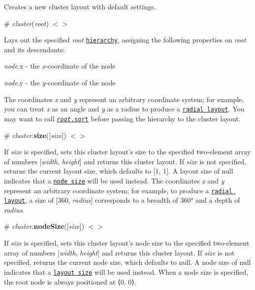Creates a new cluster layout with default settings.

\label{__cluster}%
\# {\itshape cluster}({\itshape root}) \href{https://github.com/d3/d3-hierarchy/blob/master/src/cluster.js#L39}{\tt $<$$>$}

Lays out the specified {\itshape root} \href{#hierarchy}{\tt hierarchy}, assigning the following properties on {\itshape root} and its descendants\+:


\begin{DoxyItemize}
\item {\itshape node}.x -\/ the {\itshape x}-\/coordinate of the node
\item {\itshape node}.y -\/ the {\itshape y}-\/coordinate of the node
\end{DoxyItemize}

The coordinates {\itshape x} and {\itshape y} represent an arbitrary coordinate system; for example, you can treat {\itshape x} as an angle and {\itshape y} as a radius to produce a \href{http://bl.ocks.org/mbostock/4739610f6d96aaad2fb1e78a72b385ab}{\tt radial layout}. You may want to call \href{#node_sort}{\tt {\itshape root}.sort} before passing the hierarchy to the cluster layout.

\label{_cluster_size}%
\# {\itshape cluster}.{\bfseries size}(\mbox{[}{\itshape size}\mbox{]}) \href{https://github.com/d3/d3-hierarchy/blob/master/src/cluster.js#L75}{\tt $<$$>$}

If {\itshape size} is specified, sets this cluster layout’s size to the specified two-\/element array of numbers \mbox{[}{\itshape width}, {\itshape height}\mbox{]} and returns this cluster layout. If {\itshape size} is not specified, returns the current layout size, which defaults to \mbox{[}1, 1\mbox{]}. A layout size of null indicates that a \href{#node_size}{\tt node size} will be used instead. The coordinates {\itshape x} and {\itshape y} represent an arbitrary coordinate system; for example, to produce a \href{http://bl.ocks.org/mbostock/4739610f6d96aaad2fb1e78a72b385ab}{\tt radial layout}, a size of \mbox{[}360, {\itshape radius}\mbox{]} corresponds to a breadth of 360° and a depth of {\itshape radius}.

\label{_cluster_nodeSize}%
\# {\itshape cluster}.{\bfseries node\+Size}(\mbox{[}{\itshape size}\mbox{]}) \href{https://github.com/d3/d3-hierarchy/blob/master/src/cluster.js#L79}{\tt $<$$>$}

If {\itshape size} is specified, sets this cluster layout’s node size to the specified two-\/element array of numbers \mbox{[}{\itshape width}, {\itshape height}\mbox{]} and returns this cluster layout. If {\itshape size} is not specified, returns the current node size, which defaults to null. A node size of null indicates that a \href{#cluster_size}{\tt layout size} will be used instead. When a node size is specified, the root node is always positioned at ⟨0, 0⟩.


